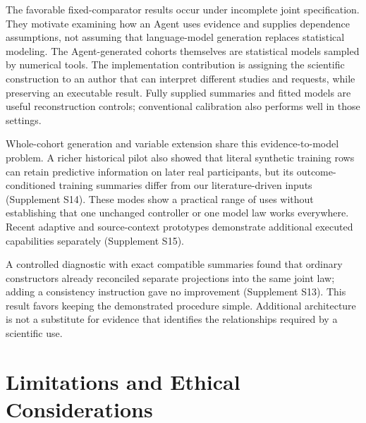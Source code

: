 \documentclass[11pt,letterpaper]{article}
\begin{document}
The favorable fixed-comparator results occur under incomplete joint specification. They motivate examining how an Agent uses evidence and supplies dependence assumptions, not assuming that language-model generation replaces statistical modeling. The Agent-generated cohorts themselves are statistical models sampled by numerical tools. The implementation contribution is assigning the scientific construction to an author that can interpret different studies and requests, while preserving an executable result. Fully supplied summaries and fitted models are useful reconstruction controls; conventional calibration also performs well in those settings.


Whole-cohort generation and variable extension share this evidence-to-model problem. A richer historical pilot also showed that literal synthetic training rows can retain predictive information on later real participants, but its outcome-conditioned training summaries differ from our literature-driven inputs (Supplement S14). These modes show a practical range of uses without establishing that one unchanged controller or one model law works everywhere. Recent adaptive and source-context prototypes demonstrate additional executed capabilities separately (Supplement S15).


A controlled diagnostic with exact compatible summaries found that ordinary constructors already reconciled separate projections into the same joint law; adding a consistency instruction gave no improvement (Supplement S13). This result favors keeping the demonstrated procedure simple. Additional architecture is not a substitute for evidence that identifies the relationships required by a scientific use.


\section{Limitations and Ethical Considerations}
\end{document}
